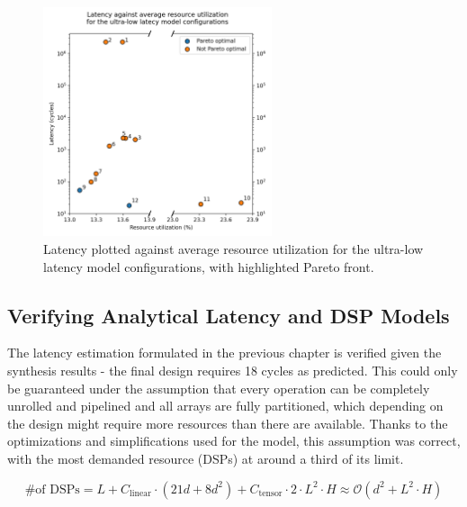 \begin{figure}[hpt!]
  \centering
  \includegraphics[trim={0cm 0cm 0cm 0cm}, clip, width=0.6\textwidth, center]{../logs/hardware_optimizations_pareto.png}
  \caption{Latency plotted against average resource utilization for the ultra-low latency model configurations, with highlighted Pareto front.}
  \label{fig:hardware-optimizations-pareto}
\end{figure}

\subsection{Verifying Analytical Latency and DSP Models}

The latency estimation formulated in the previous chapter is verified given the synthesis results - the final design requires 18 cycles as predicted. This could only be guaranteed under the assumption that every operation can be completely unrolled and pipelined and all arrays are fully partitioned, which depending on the design might require more resources than there are available. Thanks to the optimizations and simplifications used for the model, this assumption was correct, with the most demanded resource (DSPs) at around a third of its limit.

\begin{equation} \label{eq:dsp-model-new}
  \text{\# of DSPs} = L + C_{\text{linear}} \cdot (21d + 8d^2) + C_{\text{tensor}} \cdot 2 \cdot L^2 \cdot H \approx \mathcal{O}(d^2 + L^2 \cdot H)
\end{equation}

